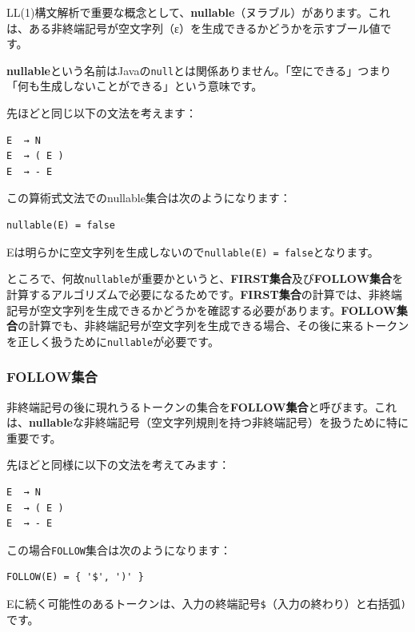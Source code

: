 LL(1)構文解析で重要な概念として、\textbf{nullable}（ヌラブル）があります。これは、ある非終端記号が空文字列（ε）を生成できるかどうかを示すブール値です。

\textbf{nullable}という名前はJavaの\texttt{null}とは関係ありません。「空にできる」つまり「何も生成しないことができる」という意味です。

先ほどと同じ以下の文法を考えます：

\begin{verbatim}
E  → N
E  → ( E )
E  → - E
\end{verbatim}

この算術式文法でのnullable集合は次のようになります：

\begin{verbatim}
nullable(E) = false
\end{verbatim}

Eは明らかに空文字列を生成しないので\texttt{nullable(E)\ =\ false}となります。

ところで、何故\texttt{nullable}が重要かというと、\textbf{FIRST集合}及び\textbf{FOLLOW集合}を計算するアルゴリズムで必要になるためです。\textbf{FIRST集合}の計算では、非終端記号が空文字列を生成できるかどうかを確認する必要があります。\textbf{FOLLOW集合}の計算でも、非終端記号が空文字列を生成できる場合、その後に来るトークンを正しく扱うために\texttt{nullable}が必要です。

\hypertarget{chapter5-followux96c6ux5408}{%
\subsubsection{FOLLOW集合}\label{chapter5-followux96c6ux5408}}

非終端記号の後に現れうるトークンの集合を\textbf{FOLLOW集合}と呼びます。これは、\textbf{nullable}な非終端記号（空文字列規則を持つ非終端記号）を扱うために特に重要です。

先ほどと同様に以下の文法を考えてみます：

\begin{verbatim}
E  → N
E  → ( E )
E  → - E
\end{verbatim}

この場合\texttt{FOLLOW}集合は次のようになります：

\begin{verbatim}
FOLLOW(E) = { '$', ')' }
\end{verbatim}

Eに続く可能性のあるトークンは、入力の終端記号\texttt{\$}（入力の終わり）と右括弧\texttt{)}です。


